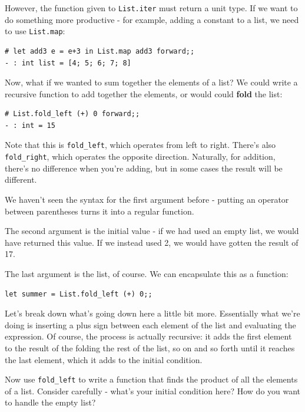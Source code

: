 \documentclass[10pt]{book}
\begin{document}
{However, the function given to {\tt List.iter} must return a 
unit type. If we want to do something more productive - for 
example, adding a constant to a list, we need to use {\tt List.map}:

\beforeverb
\begin{verbatim}
# let add3 e = e+3 in List.map add3 forward;;
- : int list = [4; 5; 6; 7; 8]
\end{verbatim}
\afterverb

Now, what if we wanted to sum together the elements of a list? 
We could write a recursive function to add together the elements, 
or would could {\bf fold} the list:

\beforeverb
\begin{verbatim}
# List.fold_left (+) 0 forward;;
- : int = 15
\end{verbatim}
\afterverb

Note that this is {\tt \verb"fold_left"}, which operates from left to right. 
There's also {\tt \verb"fold_right"}, which operates the opposite direction. 
Naturally, for addition, there's no difference when you're adding, but 
in some cases the result will be different.

We haven't seen the syntax for the first argument before - putting an operator 
between parentheses turns it into a regular function.

The second argument is the initial value - if we had used an empty list, we 
would have returned this value. If we instead used 2, we would have gotten the 
result of 17.

The last argument is the list, of course. We can encapsulate this as a function:

\beforeverb
\begin{verbatim}
let summer = List.fold_left (+) 0;;
\end{verbatim}
\afterverb

Let's break down what's going down here a little bit more. Essentially what we're 
doing is inserting a plus sign between each element of the list and evaluating the 
expression. Of course, the process is actually recursive: it adds the first element 
to the result of the folding the rest of the list, so on and so forth until it reaches 
the last element, which it adds to the initial condition.

\begin{ex}
Now use {\tt \verb"fold_left"} to write a function that finds the product of 
all the elements of a list. Consider carefully - what's your initial 
condition here? How do you want to handle the empty list?
\end{ex}

}
\end{document}
